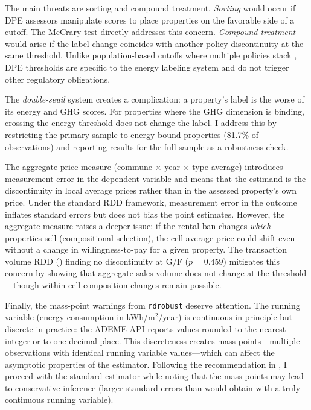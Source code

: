 \documentclass[12pt]{article}
\begin{document}
The main threats are sorting and compound treatment. \textit{Sorting} would occur if DPE assessors manipulate scores to place properties on the favorable side of a cutoff. The McCrary test directly addresses this concern. \textit{Compound treatment} would arise if the label change coincides with another policy discontinuity at the same threshold. Unlike population-based cutoffs where multiple policies stack \citep{eggers2018rdd}, DPE thresholds are specific to the energy labeling system and do not trigger other regulatory obligations.

The \textit{double-seuil} system creates a complication: a property's label is the worse of its energy and GHG scores. For properties where the GHG dimension is binding, crossing the energy threshold does not change the label. I address this by restricting the primary sample to energy-bound properties (81.7\% of observations) and reporting results for the full sample as a robustness check.

The aggregate price measure (commune $\times$ year $\times$ type average) introduces measurement error in the dependent variable and means that the estimand is the discontinuity in local average prices rather than in the assessed property's own price. Under the standard RDD framework, measurement error in the outcome inflates standard errors but does not bias the point estimates. However, the aggregate measure raises a deeper issue: if the rental ban changes \textit{which} properties sell (compositional selection), the cell average price could shift even without a change in willingness-to-pay for a given property. The transaction volume RDD () finding no discontinuity at G/F ($p = 0.459$) mitigates this concern by showing that aggregate sales volume does not change at the threshold---though within-cell composition changes remain possible.

Finally, the mass-point warnings from \texttt{rdrobust} deserve attention. The running variable (energy consumption in kWh/m$^2$/year) is continuous in principle but discrete in practice: the ADEME API reports values rounded to the nearest integer or to one decimal place. This discreteness creates mass points---multiple observations with identical running variable values---which can affect the asymptotic properties of the estimator. Following the recommendation in \citet{cattaneo2019rdr}, I proceed with the standard estimator while noting that the mass points may lead to conservative inference (larger standard errors than would obtain with a truly continuous running variable).
\end{document}
